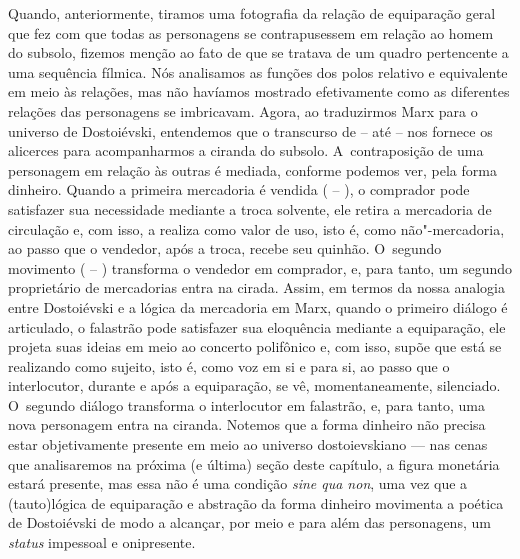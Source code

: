 Quando, anteriormente, tiramos uma fotografia da relação de equiparação
geral que fez com que todas as personagens se contrapusessem em relação
ao homem do subsolo, fizemos menção ao fato de que se tratava de um
quadro pertencente a uma sequência fílmica. Nós analisamos as funções
dos polos relativo e equivalente em meio às relações, mas não havíamos
mostrado efetivamente como as diferentes relações das personagens se
imbricavam. Agora, ao traduzirmos Marx para o universo de Dostoiévski,
entendemos que o transcurso de  --  até  --  nos fornece os
alicerces para acompanharmos a ciranda do subsolo. A~contraposição de
uma personagem em relação às outras é mediada, conforme podemos ver,
pela forma dinheiro. Quando a primeira mercadoria é vendida ( -- ), o
comprador pode satisfazer sua necessidade mediante a troca solvente, ele
retira a mercadoria de circulação e, com isso, a realiza como valor de
uso, isto é, como não"-mercadoria, ao passo que o vendedor, após a troca,
recebe seu quinhão. O~segundo movimento ( -- ) transforma o vendedor
em comprador, e, para tanto, um segundo proprietário de mercadorias
entra na cirada. Assim, em termos da nossa analogia entre Dostoiévski e
a lógica da mercadoria em Marx, quando o primeiro diálogo é articulado,
o falastrão pode satisfazer sua eloquência mediante a equiparação, ele
projeta suas ideias em meio ao concerto polifônico e, com isso, supõe
que está se realizando como sujeito, isto é, como voz em si e para si,
ao passo que o interlocutor, durante e após a equiparação, se vê,
momentaneamente, silenciado. O~segundo diálogo transforma o interlocutor
em falastrão, e, para tanto, uma nova personagem entra na ciranda.
Notemos que a forma dinheiro não precisa estar objetivamente presente em
meio ao universo dostoievskiano --- nas cenas que analisaremos na próxima
(e última) seção deste capítulo, a figura monetária estará presente, mas
essa não é uma condição \emph{sine qua non}, uma vez que a (tauto)lógica
de equiparação e abstração da forma dinheiro movimenta a poética de
Dostoiévski de modo a alcançar, por meio e para além das personagens, um
\emph{status} impessoal e onipresente.

